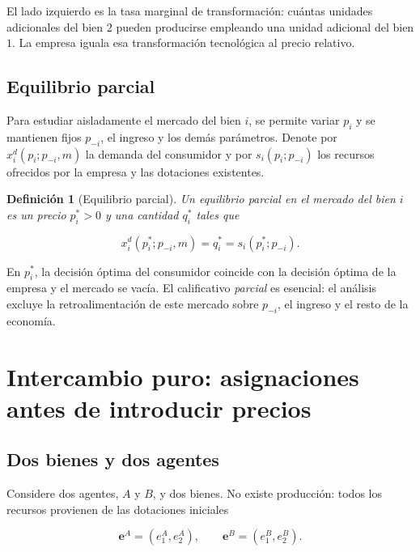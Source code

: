 \documentclass[12pt]{article}
\theoremstyle{cideplain}
\theoremstyle{cidedef}
\newtheorem{definition}[theorem]{Definición}
\newcommand{\e}{\bm e}
\begin{document}
El lado izquierdo es la tasa marginal de transformación: cuántas unidades adicionales del
bien \(2\) pueden producirse empleando una unidad adicional del bien \(1\). La empresa
iguala esa transformación tecnológica al precio relativo.

\subsection{Equilibrio parcial}

Para estudiar aisladamente el mercado del bien \(i\), se permite variar \(p_i\) y se
mantienen fijos \(p_{-i}\), el ingreso y los demás parámetros. Denote por
\(x_i^d(p_i;p_{-i},m)\) la demanda del consumidor y por
\(s_i(p_i;p_{-i})\) los recursos ofrecidos por la empresa y las dotaciones existentes.

\begin{definition}[Equilibrio parcial]
Un equilibrio parcial en el mercado del bien \(i\) es un precio \(p_i^*>0\) y una cantidad
\(q_i^*\) tales que

\begin{equation}
  x_i^d(p_i^*;p_{-i},m)
  =
  q_i^*
  =
  s_i(p_i^*;p_{-i}).
  \label{eq:partial-equilibrium}
\end{equation}
\end{definition}

En \(p_i^*\), la decisión óptima del consumidor coincide con la decisión óptima de la
empresa y el mercado se vacía. El calificativo \emph{parcial} es esencial: el análisis
excluye la retroalimentación de este mercado sobre \(p_{-i}\), el ingreso y el resto de
la economía.

\section{Intercambio puro: asignaciones antes de introducir precios}

\subsection{Dos bienes y dos agentes}

Considere dos agentes, \(A\) y \(B\), y dos bienes. No existe producción: todos los
recursos provienen de las dotaciones iniciales

\[
  \e^A=(e_1^A,e_2^A),
  \qquad
  \e^B=(e_1^B,e_2^B).
\]
\end{document}
